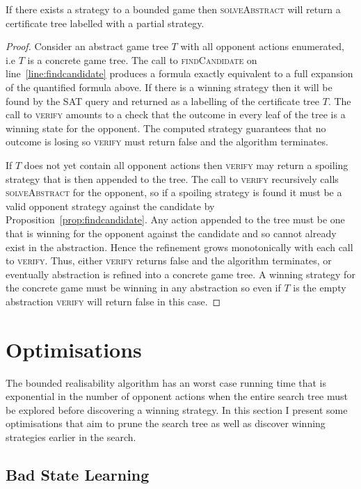 \begin{theorem}
    If there exists a strategy to a bounded game then \textsc{solveAbstract} will return a certificate tree labelled with a partial strategy.
\end{theorem}
\begin{proof}
    Consider an abstract game tree $T$ with all opponent actions enumerated, i.e $T$ is a concrete game tree. The call to \textsc{findCandidate} on line~\ref{line:findcandidate} produces a formula exactly equivalent to a full expansion of the quantified formula above. If there is a winning strategy then it will be found by the SAT query and returned as a labelling of the certificate tree $T$. The call to \textsc{verify} amounts to a check that the outcome in every leaf of the tree is a winning state for the opponent. The computed strategy guarantees that no outcome is losing so \textsc{verify} must return false and the algorithm terminates.

    If $T$ does not yet contain all opponent actions then \textsc{verify} may return a spoiling strategy that is then appended to the tree. The call to \textsc{verify} recursively calls \textsc{solveAbstract} for the opponent, so if a spoiling strategy is found it must be a valid opponent strategy against the candidate by Proposition~\ref{prop:findcandidate}. Any action appended to the tree must be one that is winning for the opponent against the candidate and so cannot already exist in the abstraction. Hence the refinement grows monotonically with each call to \textsc{verify}. Thus, either \textsc{verify} returns false and the algorithm terminates, or eventually abstraction is refined into a concrete game tree. A winning strategy for the concrete game must be winning in any abstraction so even if $T$ is the empty abstraction \textsc{verify} will return false in this case.
\end{proof}

\section{Optimisations}

The bounded realisability algorithm has an worst case running time that is exponential in the number of opponent actions when the entire search tree must be explored before discovering a winning strategy. In this section I present some optimisations that aim to prune the search tree as well as discover winning strategies earlier in the search.

\subsection{Bad State Learning}
\label{sec:boundedLearning}

